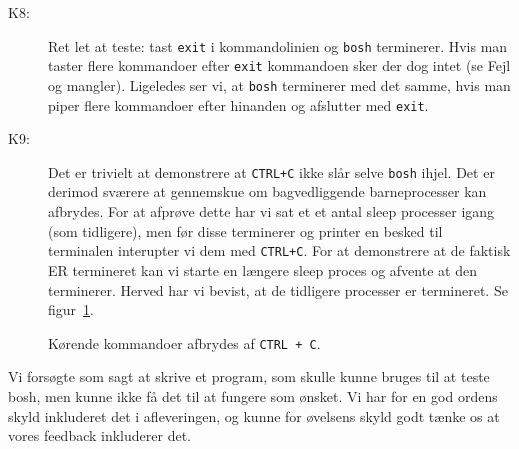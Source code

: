 \documentclass{article}
\begin{document}
\begin{description}
\item[K8:] Ret let at teste: tast \texttt{exit} i kommandolinien og \texttt{bosh} terminerer. Hvis man taster flere kommandoer efter \texttt{exit} kommandoen sker der dog intet (se Fejl og mangler). Ligeledes ser vi, at \texttt{bosh} terminerer med det samme, hvis man piper flere kommandoer efter hinanden og afslutter med \texttt{exit}.

\item[K9:] Det er trivielt at demonstrere at \texttt{CTRL+C} ikke slår selve \texttt{bosh} ihjel. Det er derimod sværere at gennemskue om bagvedliggende barneprocesser kan afbrydes. For at afprøve dette har vi sat et et antal sleep processer igang (som tidligere), men før disse terminerer og printer en besked til terminalen interupter vi dem med \texttt{CTRL+C}. For at demonstrere at de faktisk ER termineret kan vi starte en længere sleep proces og afvente at den terminerer. Herved har vi bevist, at de tidligere processer er termineret. Se figur~\ref{fig:ctrlctest}.

\end{description}
\begin{figure}[H]
\center
{}
\caption{Kørende kommandoer afbrydes af \texttt{CTRL + C}.}
\label{fig:ctrlctest}
\end{figure}

Vi forsøgte som sagt at skrive et program, som skulle kunne bruges til at teste bosh, men kunne ikke få det til at fungere som ønsket. Vi har for en god ordens skyld inkluderet det i afleveringen, og kunne for øvelsens skyld godt tænke os at vores feedback inkluderer det.
\end{document}
